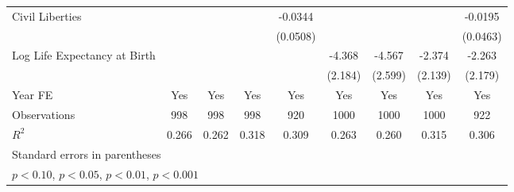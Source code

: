 \begin{table}[htbp]
\begin{tabular}{l*{8}{c}}
\addlinespace
Civil Liberties &                  &                  &                  &  -0.0344         &                  &                  &                  &  -0.0195         \\
                &                  &                  &                  & (0.0508)         &                  &                  &                  & (0.0463)         \\
\addlinespace
Log Life Expectancy at Birth&                  &                  &                  &                  &   -4.368\sym{*}  &   -4.567\sym{+}  &   -2.374         &   -2.263         \\
                &                  &                  &                  &                  &  (2.184)         &  (2.599)         &  (2.139)         &  (2.179)         \\
\addlinespace
Year FE         &      Yes         &      Yes         &      Yes         &      Yes         &      Yes         &      Yes         &      Yes         &      Yes         \\
\midrule
Observations    &      998         &      998         &      998         &      920         &     1000         &     1000         &     1000         &      922         \\
\(R^{2}\)       &    0.266         &    0.262         &    0.318         &    0.309         &    0.263         &    0.260         &    0.315         &    0.306         \\
\bottomrule
\multicolumn{9}{l}{\footnotesize Standard errors in parentheses}\\
\multicolumn{9}{l}{\footnotesize \sym{+} \(p<0.10\), \sym{*} \(p<0.05\), \sym{**} \(p<0.01\), \sym{***} \(p<0.001\)}\\
\end{tabular}
\end{table}
